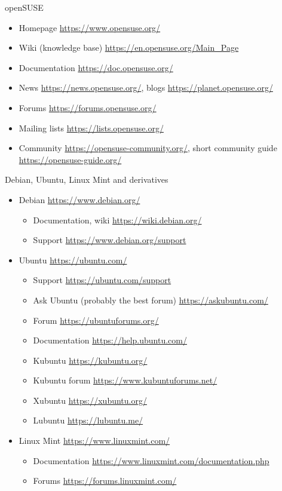\documentclass[compress, ucs, xelatex, 11pt, xcolor=svgnames, aspectratio=169,
	hyperref={
		bookmarks=true,
		unicode=true,
		colorlinks=true,
		pdftitle={Linux, command line and MetaCentrum},
		plainpages=false,
		pdfauthor={Vojtech Zeisek},
		pdfsubject={Course about use of Linux command line, writing shell scripts and using MetaCentrum of CESNET},
		pdfcreator={XeLaTeX},
		pdfkeywords={Linux, GNU, BASH, shell, command line, MetaCentrum},
		linkcolor=DarkRed, %
		anchorcolor=DarkBlue, %
		citecolor=Indigo, %
		filecolor=NavyBlue, %
		menucolor=DarkMagenta, %
		urlcolor=DarkBlue, %
		pdftex},
	url={hyphens, lowtilde} %
	]{beamer}
\begin{document}
\begin{frame}{openSUSE}
	\begin{itemize}
		\item Homepage \url{https://www.opensuse.org/}
		\item Wiki (knowledge base) \url{https://en.opensuse.org/Main_Page}
		\item Documentation \url{https://doc.opensuse.org/}
		\item News \url{https://news.opensuse.org/}, blogs \url{https://planet.opensuse.org/}
		\item Forums \url{https://forums.opensuse.org/}
		\item Mailing lists \url{https://lists.opensuse.org/}
		\item Community \url{https://opensuse-community.org/}, short community guide \url{https://opensuse-guide.org/}
	\end{itemize}
\end{frame}

\begin{frame}{Debian, Ubuntu, Linux Mint and derivatives}
	\begin{itemize}
		\item Debian \url{https://www.debian.org/}
		\begin{itemize}
			\item Documentation, wiki \url{https://wiki.debian.org/}
			\item Support \url{https://www.debian.org/support}
		\end{itemize}
		\item Ubuntu \url{https://ubuntu.com/}
		\begin{itemize}
			\item Support \url{https://ubuntu.com/support}
			\item Ask Ubuntu (probably the best forum) \url{https://askubuntu.com/}
			\item Forum \url{https://ubuntuforums.org/}
			\item Documentation \url{https://help.ubuntu.com/}
			\item Kubuntu \url{https://kubuntu.org/}
			\item Kubuntu forum \url{https://www.kubuntuforums.net/}
			\item Xubuntu \url{https://xubuntu.org/}
			\item Lubuntu \url{https://lubuntu.me/}
		\end{itemize}
		\item Linux Mint \url{https://www.linuxmint.com/}
		\begin{itemize}
			\item Documentation \url{https://www.linuxmint.com/documentation.php}
			\item Forums \url{https://forums.linuxmint.com/}
		\end{itemize}
	\end{itemize}
\end{frame}
\end{document}
